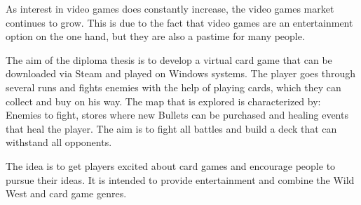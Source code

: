 
%
As interest in video games does constantly increase, the video games market continues to grow. This is due to the fact that video games are an entertainment option on the one hand, but they are also a pastime for many people.


The aim of the diploma thesis is to develop a virtual card game that can be downloaded via Steam and played on Windows systems.
The player goes through several runs and fights enemies with the help of playing cards, which they can collect and buy on his way.
The map that is explored is characterized by: Enemies to fight, stores where new Bullets can be purchased and healing events that heal the player.
The aim is to fight all battles and build a deck that can withstand all opponents.


The idea is to get players excited about card games and encourage people to pursue their ideas. It is intended to provide entertainment and combine the Wild West and card game genres.
%